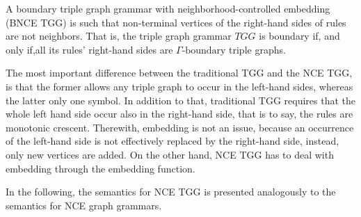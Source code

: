 \begin{definition}
	A boundary triple graph grammar with neighborhood-controlled embedding (BNCE TGG) is such that non-terminal vertices of the right-hand sides of rules are not neighbors. That is, the triple graph grammar $TGG$ is boundary if, and only if,all its rules' right-hand sides are $\Gamma\text{-boundary}$ triple graphs.
\end{definition}

The most important difference between the traditional TGG and the NCE TGG, is that the former allows any triple graph to occur in the left-hand sides, whereas the latter only one symbol. In addition to that, traditional TGG requires that the whole left hand side occur also in the right-hand side, that is to say, the rules are monotonic crescent. Therewith, embedding is not an issue, because an occurrence of the left-hand side is not effectively replaced by the right-hand side, instead, only new vertices are added. On the other hand, NCE TGG has to deal with embedding through the embedding function.

In the following, the semantics for NCE TGG is presented analogously to the semantics for NCE graph grammars.

